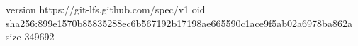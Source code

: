 version https://git-lfs.github.com/spec/v1
oid sha256:899e1570b85835288ec6b567192b17198ae665590c1ace9f5ab02a6978ba862a
size 349692
